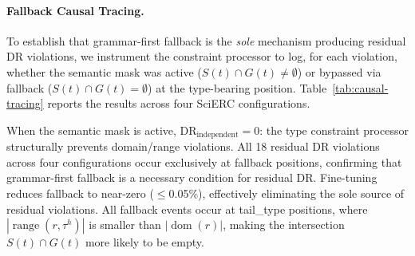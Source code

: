 
\paragraph{Fallback Causal Tracing.}
\label{app:causal-tracing}

To establish that grammar-first fallback is the \emph{sole} mechanism producing residual DR violations, we instrument the constraint processor to log, for each violation, whether the semantic mask was active ($S(t) \cap G(t) \neq \emptyset$) or bypassed via fallback ($S(t) \cap G(t) = \emptyset$) at the type-bearing position.
Table~\ref{tab:causal-tracing} reports the results across four SciERC configurations.

\begin{table}[t]
\centering
\small
\setlength{\tabcolsep}{4pt}
\caption{Fallback causal tracing on SciERC (551 documents). Fallback Rate: type-bearing positions where $S(t) \cap G(t) = \emptyset$ triggers grammar-first fallback. DR: residual domain/range violations. From FB: fraction of DR violations occurring at fallback positions. All violations occur exclusively at tail\_type positions (range constraints are tighter than domain constraints).}
\label{tab:causal-tracing}
\end{table}

When the semantic mask is active, $\text{DR}_{\text{independent}} = 0$: the type constraint processor structurally prevents domain/range violations.
All 18 residual DR violations across four configurations occur exclusively at fallback positions, confirming that grammar-first fallback is a necessary condition for residual DR.
Fine-tuning reduces fallback to near-zero ($\leq$0.05\%), effectively eliminating the sole source of residual violations.
All fallback events occur at tail\_type positions, where $|\operatorname{range}(r, \tau^h)|$ is smaller than $|\operatorname{dom}(r)|$, making the intersection $S(t) \cap G(t)$ more likely to be empty.


